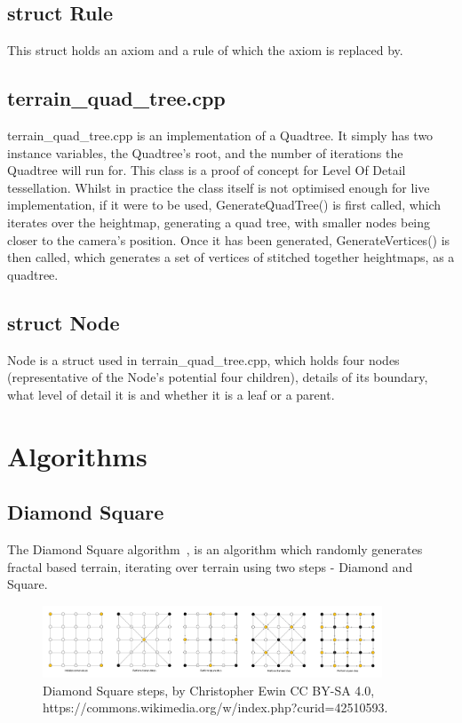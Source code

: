 \documentclass[a4paper,10pt]{report}
\begin{document}
\subsection{struct Rule}
This struct holds an axiom and a rule of which the axiom is replaced by. 

\subsection{terrain\_quad\_tree.cpp}
terrain\_quad\_tree.cpp is an implementation of a Quadtree. It simply has two instance variables, the Quadtree's root, and the number of iterations the Quadtree will run for. This class is a proof of concept for Level Of Detail tessellation. Whilst in practice the class itself is not optimised enough for live implementation, if it were to be used, GenerateQuadTree() is first called, which iterates over the heightmap, generating a quad tree, with smaller nodes being closer to the camera's position. Once it has been generated, GenerateVertices() is then called, which generates a set of vertices of stitched together heightmaps, as a quadtree. 

\subsection{struct Node}
Node is a struct used in terrain\_quad\_tree.cpp, which holds four nodes (representative of the Node's potential four children), details of its boundary, what level of detail it is and whether it is a leaf or a parent.


\clearpage

\section{Algorithms}
\subsection{Diamond Square}
The Diamond Square algorithm~\cite{miller1986definition}, is an algorithm which randomly generates fractal based terrain, iterating over terrain using two steps - Diamond and Square. \medskip 

\begin{figure}[h!]
    \centering
  \includegraphics[width=0.9\textwidth]{Images/External/Diamond_Square.png}
 \caption[Diamond Square steps, by Christopher Ewin]{Diamond Square steps, by Christopher Ewin CC BY-SA 4.0, https://commons.wikimedia.org/w/index.php?curid=42510593.}
 \label{fig:diamond_square_steps}
\end{figure} 
\end{document}
